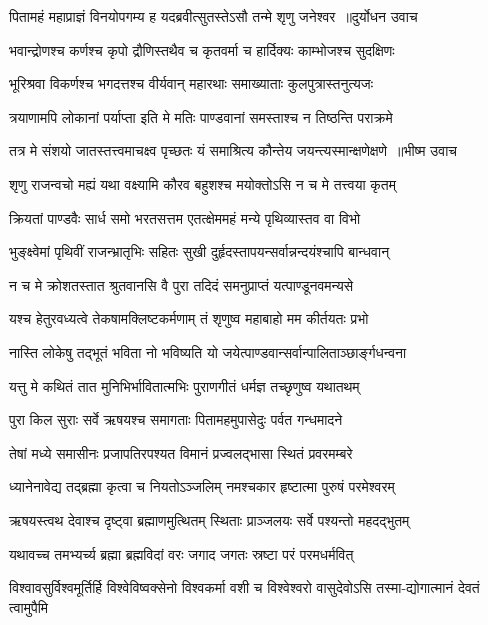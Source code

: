 \threelineshloka
{पितामहं महाप्राज्ञं विनयोपगम्य ह}
{यदब्रवीत्सुतस्तेऽसौ तन्मे शृणु जनेश्वर ॥दुर्योधन उवाच}
{}


\twolineshloka
{भवान्द्रोणश्च कर्णश्च कृपो द्रौणिस्तथैव च}
{कृतवर्मा च हार्दिक्यः काम्भोजश्च सुदक्षिणः}


\twolineshloka
{भूरिश्रवा विकर्णश्च भगदत्तश्च वीर्यवान्}
{महारथाः समाख्याताः कुलपुत्रास्तनुत्यजः}


\twolineshloka
{त्रयाणामपि लोकानां पर्याप्ता इति मे मतिः}
{पाण्डवानां समस्ताश्च न तिष्ठन्ति पराक्रमे}


\threelineshloka
{तत्र मे संशयो जातस्तत्त्वमाचक्ष्व पृच्छतः}
{यं समाश्रित्य कौन्तेय जयन्त्यस्मान्क्षणेक्षणे ॥भीष्म उवाच}
{}


\twolineshloka
{शृणु राजन्वचो मह्यं यथा वक्ष्यामि कौरव}
{बहुशश्च मयोक्तोऽसि न च मे तत्त्वया कृतम्}


\twolineshloka
{क्रियतां पाण्डवैः सार्ध समो भरतसत्तम}
{एतत्क्षेममहं मन्ये पृथिव्यास्तव वा विभो}


\twolineshloka
{भुङ्क्ष्वेमां पृथिवीं राजन्भ्रातृभिः सहितः सुखी}
{दुर्हृदस्तापयन्सर्वान्नन्दयंश्चापि बान्धवान्}


\twolineshloka
{न च मे क्रोशतस्तात श्रुतवानसि वै पुरा}
{तदिदं समनुप्राप्तं यत्पाण्डूनवमन्यसे}


\twolineshloka
{यश्च हेतुरवध्यत्वे तेकषामक्लिष्टकर्मणाम्}
{तं शृणुष्व महाबाहो मम कीर्तयतः प्रभो}


\twolineshloka
{नास्ति लोकेषु तद्भूतं भविता नो भविष्यति}
{यो जयेत्पाण्डवान्सर्वान्पालिताञ्छार्ङ्गधन्वना}


\twolineshloka
{यत्तु मे कथितं तात मुनिभिर्भावितात्मभिः}
{पुराणगीतं धर्मज्ञ तच्छृणुष्व यथातथम्}


\twolineshloka
{पुरा किल सुराः सर्वे ऋषयश्च समागताः}
{पितामहमुपासेदुः पर्वत गन्धमादने}


\twolineshloka
{तेषां मध्ये समासीनः प्रजापतिरपश्यत}
{विमानं प्रज्वलद्भासा स्थितं प्रवरमम्बरे}


\twolineshloka
{ध्यानेनावेद्य तद्ब्रह्मा कृत्वा च नियतोऽञ्जलिम्}
{नमश्चकार हृष्टात्मा पुरुषं परमेश्वरम्}


\twolineshloka
{ऋषयस्त्वथ देवाश्च दृष्ट्वा ब्रह्माणमुत्थितम्}
{स्थिताः प्राञ्जलयः सर्वे पश्यन्तो महदद्भुतम्}


\twolineshloka
{यथावच्च तमभ्यर्च्य ब्रह्मा ब्रह्मविदां वरः}
{जगाद जगतः स्रष्टा परं परमधर्मवित्}


\twolineshloka
{विश्वावसुर्विश्वमूर्तिर्हि विश्वेविष्वक्सेनो विश्वकर्मा वशी च}
{विश्वेश्वरो वासुदेवोऽसि तस्मा-द्योगात्मानं देवतं त्वामुपैमि}


